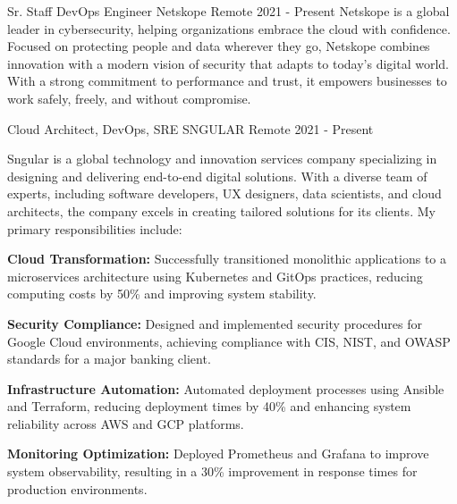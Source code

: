 \documentclass[11pt, a4paper]{awesome-cv}
\begin{document}
\vspace{-10pt}

\begin{cventries}

	\cventry
	{Sr. Staff DevOps Engineer} %
	{Netskope} %
	{Remote} %
	{2021 - Present
	} %
	{
		{Netskope is a global leader in cybersecurity, helping organizations embrace the cloud with confidence. Focused on protecting people and data wherever they go, Netskope combines innovation with a modern vision of security that adapts to today’s digital world. With a strong commitment to performance and trust, it empowers businesses to work safely, freely, and without compromise.
		}
	}

	\cventry
	{Cloud Architect, DevOps, SRE} %
	{SNGULAR} %
	{Remote} %
	{2021 - Present
	} %
	{
		{Sngular is a global technology and innovation services company specializing in designing and delivering end-to-end digital solutions. With a diverse team of experts, including software developers, UX designers, data scientists, and cloud architects, the company excels in creating tailored solutions for its clients. My primary responsibilities include:
		\vspace{15pt}
		\begin{cvitems} %
		    \item \textbf{Cloud Transformation:} Successfully transitioned monolithic applications to a microservices architecture using Kubernetes and GitOps practices, reducing computing costs by 50\% and improving system stability.
		    \item \textbf{Security Compliance:} Designed and implemented security procedures for Google Cloud environments, achieving compliance with CIS, NIST, and OWASP standards for a major banking client.
		    \item \textbf{Infrastructure Automation:} Automated deployment processes using Ansible and Terraform, reducing deployment times by 40\% and enhancing system reliability across AWS and GCP platforms.
		    \item \textbf{Monitoring Optimization:} Deployed Prometheus and Grafana to improve system observability, resulting in a 30\% improvement in response times for production environments.
	\end{cvitems}}
	}
	

\end{cventries}
\end{document}
